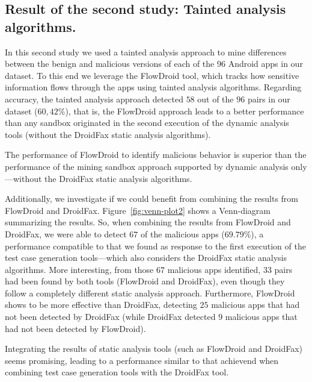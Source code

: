 
\subsection{Result of the second study: Tainted analysis algorithms.}\label{sec:res-ss}

In this second study we used a tainted analysis approach to mine differences between the benign and malicious versions of each of the 96 Android apps in our dataset. To this end we leverage the FlowDroid tool, which tracks how sensitive information flows through the apps using tainted analysis algorithms. Regarding accuracy, the tainted analysis approach detected $58$ out of the $96$ pairs in our dataset ($60,42$\%), that is, the FlowDroid approach leads to a better performance than any sandbox originated in the second execution of the dynamic analysis tools (without the DroidFax static analysis algorithms).

\begin{finding}
  The performance of FlowDroid to identify malicious behavior
  is superior than the performance of the
  mining sandbox approach supported by dynamic analysis only---without
  the DroidFax static analysis algorithms.
\end{finding}

Additionally, we investigate if we could benefit from combining
the results from FlowDroid and DroidFax. Figure~\ref{fig:venn-plot2} shows a
Venn-diagram summarizing the results. So, when combining
the results from FlowDroid and DroidFax, we were able to detect
$67$ of the malicious apps ($69.79$\%), a performance compatible
to that we found as response to the first execution of the
test case generation tools---which also considers the DroidFax
static analysis algorithms. More interesting, from those $67$
malicious apps identified, $33$ pairs had been found by
both tools (FlowDroid and DroidFax), even though they follow
a completely different static analysis approach. Furthermore,
FlowDroid shows to be more effective than DroidFax, detecting $25$ malicious
apps that had not been detected by DroidFax (while DroidFax detected $9$
malicious apps that had not been detected by FlowDroid).

\begin{finding}
  Integrating the results of static analysis tools
  (such as FlowDroid and DroidFax) seems promising,
  leading to a performance similar to that achievend
  when combining test case generation tools with the
  DroidFax tool. 
\end{finding}

